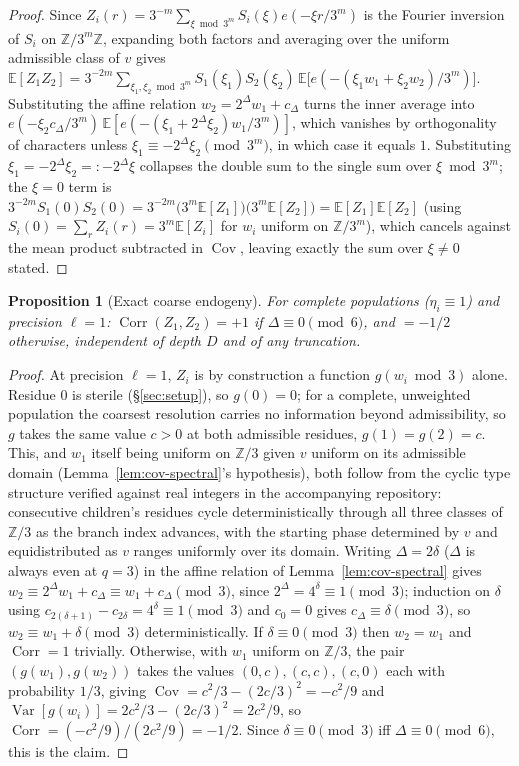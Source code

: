 \documentclass[11pt]{article}
\newtheorem{proposition}[theorem]{Proposition}
\theoremstyle{definition}
\theoremstyle{remark}
\DeclareMathOperator{\Cov}{Cov}
\DeclareMathOperator{\Var}{Var}
\DeclareMathOperator{\Corr}{Corr}
\begin{document}
\begin{proof}
Since $Z_i(r)=3^{-m}\sum_{\xi\bmod3^m}S_i(\xi)e(-\xi r/3^m)$ is the
Fourier inversion of $S_i$ on $\mathbb Z/3^m\mathbb Z$, expanding both
factors and averaging over the uniform admissible class of $v$ gives
$\mathbb E[Z_1Z_2]=3^{-2m}\sum_{\xi_1,\xi_2\bmod3^m}S_1(\xi_1)S_2(\xi_2)\,
\mathbb E\bigl[e(-(\xi_1w_1+\xi_2w_2)/3^m)\bigr]$. Substituting the
affine relation $w_2=2^\Delta w_1+c_\Delta$ turns the inner average
into $e(-\xi_2c_\Delta/3^m)\,\mathbb E[e(-(\xi_1+2^\Delta\xi_2)w_1/3^m)]$,
which vanishes by orthogonality of characters unless
$\xi_1\equiv-2^\Delta\xi_2\pmod{3^m}$, in which case it equals $1$.
Substituting $\xi_1=-2^\Delta\xi_2=:-2^\Delta\xi$ collapses the double
sum to the single sum over $\xi\bmod3^m$; the $\xi=0$ term is
$3^{-2m}S_1(0)S_2(0)=3^{-2m}\bigl(3^m\mathbb E[Z_1]\bigr)\bigl(3^m
\mathbb E[Z_2]\bigr)=\mathbb E[Z_1]\mathbb E[Z_2]$ (using
$S_i(0)=\sum_rZ_i(r)=3^m\mathbb E[Z_i]$ for $w_i$ uniform on
$\mathbb Z/3^m$), which cancels against the mean product subtracted in
$\Cov$, leaving exactly the sum over $\xi\ne0$ stated.
\end{proof}

\begin{proposition}[Exact coarse endogeny]\label{prop:exact-endogeny}
For complete populations ($\eta_i\equiv 1$) and precision $\ell=1$:
$\Corr(Z_1,Z_2)=+1$ if $\Delta\equiv 0\pmod 6$, and $=-1/2$ otherwise,
independent of depth $D$ and of any truncation.
\end{proposition}

\begin{proof}
At precision $\ell=1$, $Z_i$ is by construction a function
$g(w_i\bmod3)$ alone. Residue $0$ is sterile (\S\ref{sec:setup}), so
$g(0)=0$; for a complete, unweighted population the coarsest
resolution carries no information beyond admissibility, so $g$ takes
the same value $c>0$ at both admissible residues, $g(1)=g(2)=c$. This,
and $w_1$ itself being uniform on $\mathbb Z/3$ given $v$ uniform on
its admissible domain (Lemma~\ref{lem:cov-spectral}'s hypothesis), both
follow from the cyclic type structure verified against real integers in
the accompanying repository: consecutive children's residues cycle deterministically through all
three classes of $\mathbb Z/3$ as the branch index advances, with the
starting phase determined by $v$ and equidistributed as $v$ ranges
uniformly over its domain.
Writing $\Delta=2\delta$ ($\Delta$ is always even at $q=3$) in the
affine relation of Lemma~\ref{lem:cov-spectral} gives
$w_2\equiv2^\Delta w_1+c_\Delta\equiv w_1+c_\Delta\pmod3$, since
$2^\Delta=4^\delta\equiv1\pmod3$; induction on $\delta$ using
$c_{2(\delta+1)}-c_{2\delta}=4^\delta\equiv1\pmod3$ and $c_0=0$ gives
$c_\Delta\equiv\delta\pmod3$, so $w_2\equiv w_1+\delta\pmod3$
deterministically. If $\delta\equiv0\pmod3$ then $w_2=w_1$ and
$\Corr=1$ trivially. Otherwise, with $w_1$ uniform on $\mathbb Z/3$,
the pair $(g(w_1),g(w_2))$ takes the values $(0,c),(c,c),(c,0)$ each
with probability $1/3$, giving $\Cov=c^2/3-(2c/3)^2=-c^2/9$ and
$\Var[g(w_i)]=2c^2/3-(2c/3)^2=2c^2/9$, so
$\Corr=(-c^2/9)/(2c^2/9)=-1/2$. Since $\delta\equiv0\pmod3$ iff
$\Delta\equiv0\pmod6$, this is the claim.
\end{proof}
\end{document}
